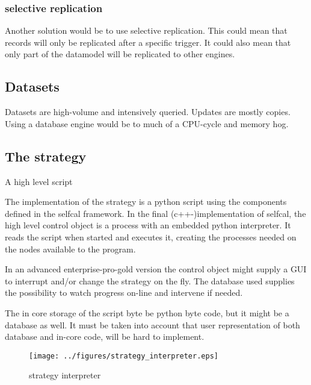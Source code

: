 \documentclass[]{lofar}
\begin{document}
      \subsubsection{selective replication}
      \label{subsubsec:selective-replication}\hypertarget{subsubsec:selective-replication}{}%

        Another solution would be to use selective replication. This
        could mean that records will only be replicated after a
        specific trigger. It could also mean that only part of the
        datamodel will be replicated to other engines.

    \subsection{Datasets}
    \label{subsec:Datasets}\hypertarget{subsec:Datasets}{}%

      Datasets are high-volume and intensively queried. Updates are
      mostly copies. Using a database engine would be to much of a
      CPU-cycle and memory hog.

    \subsection{The strategy}{A high level script}
    \label{subsec:strategy}\hypertarget{subsec:strategy}{}

      The implementation of the strategy is a python script using the
      components defined in the selfcal framework. In the final
      (c++-)implementation of selfcal, the high level control object
      is a process with an embedded python interpreter. It reads the
      script when started and executes it, creating the processes
      needed on the nodes available to the program.

      In an advanced enterprise-pro-gold version the control object
      might supply a GUI to interrupt and/or change the strategy on
      the fly. The database used supplies the possibility to watch
      progress on-line and intervene if needed.

      The in core storage of the script byte be python byte code, but
      it might be a database as well. It must be taken into account
      that user representation of both database and in-core code, will
      be hard to implement.

      \begin{figure}
        \texttt{[image: ../figures/strategy\_interpreter.eps]}
        \hypertarget{fig:strategy_interpreter}{}
        \caption{strategy interpreter\label{fig:strategy_interpreter}}
      \end{figure}
\end{document}

